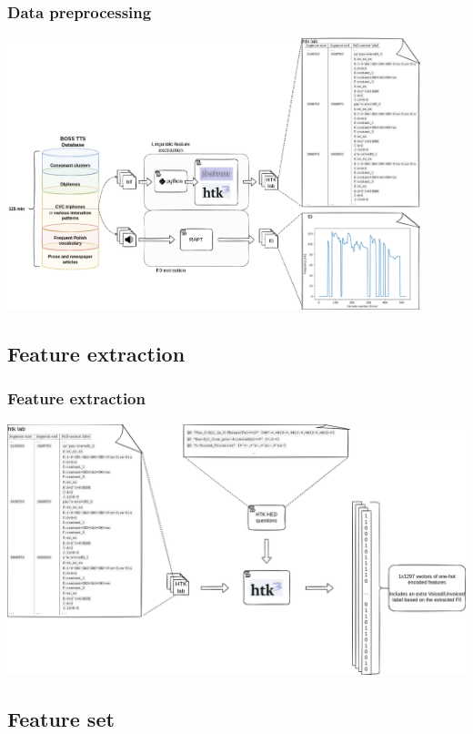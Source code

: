 \documentclass[a4paper,9pt]{beamer}
\theoremstyle{mytheoremstyle}
\begin{document}
\begin{frame}
\frametitle{Data preprocessing}
\begin{center}
  \includegraphics[width=0.9\textwidth]{res/dataset_preprocessing}
\end{center}
\end{frame}


\subsection{Feature extraction}

\begin{frame}
\frametitle{Feature extraction}
\begin{center}
  \includegraphics[width=\textwidth]{res/dataset_feature_extraction}
\end{center}
\end{frame}

\subsection{Feature set}
\end{document}
